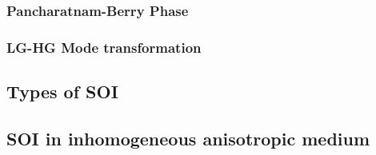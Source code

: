 \documentclass[11pt,a4paper]{article}
\numberwithin{equation}{section}
\begin{document}
\subsubsection{Pancharatnam-Berry Phase}

\subsubsection{LG-HG Mode transformation}

\subsection{Types of SOI}

\subsection{SOI in inhomogeneous anisotropic medium}


\clearpage
\end{document}
